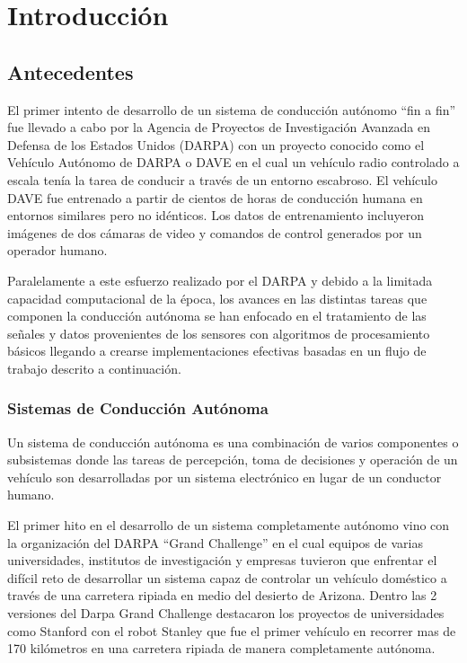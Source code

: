 \chapter{Introducción} \label{ch:introduccion}

\section{Antecedentes} \label{sec:antecedentes}

El primer intento de desarrollo de un sistema de conducción autónomo “fin a fin” fue llevado a cabo por la Agencia 
de Proyectos de Investigación Avanzada en Defensa de los Estados Unidos (DARPA) con un proyecto conocido 
como el Vehículo Autónomo de DARPA o DAVE \cite{lecun2004dave} en el cual un vehículo radio controlado a escala tenía la 
tarea de conducir a través de un entorno escabroso. El vehículo DAVE fue entrenado a partir de cientos de
horas de conducción humana en entornos similares pero no idénticos. Los datos de entrenamiento 
incluyeron imágenes de dos cámaras de video y comandos de control generados por un operador humano. 

Paralelamente a este esfuerzo realizado por el DARPA y debido a la limitada capacidad computacional de la época, 
los avances en las distintas tareas que componen la conducción autónoma se han enfocado en el tratamiento de las señales 
y datos provenientes de los sensores con algoritmos de procesamiento básicos llegando a crearse implementaciones efectivas 
basadas en un flujo de trabajo descrito a continuación.

\subsection{Sistemas de Conducción Autónoma}
Un sistema de conducción autónoma es una combinación de varios componentes o subsistemas donde las tareas 
de percepción, toma de decisiones y operación de un vehículo son desarrolladas por un sistema electrónico en lugar
de un conductor humano. 

El primer hito en el desarrollo de un sistema completamente autónomo vino 
con la organización del DARPA “Grand Challenge” en el cual equipos de varias universidades, 
institutos de investigación y empresas tuvieron que enfrentar el difícil reto de desarrollar 
un sistema capaz de controlar un vehículo doméstico a través de una carretera 
ripiada en medio del desierto de Arizona. Dentro las 2 versiones del Darpa Grand Challenge 
destacaron los proyectos de universidades como Stanford con el robot Stanley \cite{Thrun2006} que fue el primer 
vehículo en recorrer mas de 170 kilómetros en una carretera ripiada de manera completamente autónoma. 


